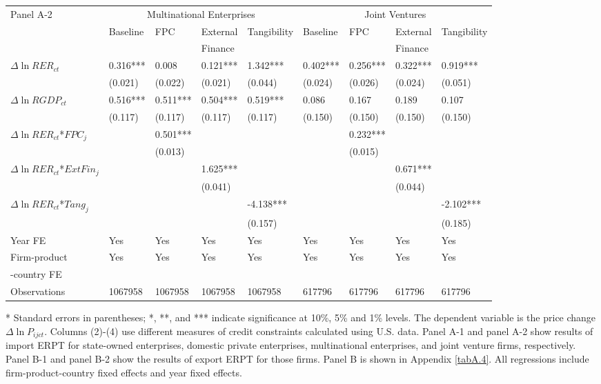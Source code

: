 \documentclass[12pt]{article}
\begin{document}
\begin{table}[htbp]
{\begin{threeparttable}
\begin{tabular}{lllllllll}
				\midrule
				Panel A-2 & \multicolumn{4}{c}{Multinational Enterprises} & \multicolumn{4}{c}{Joint Ventures} \\
				& Baseline & FPC   & External  & Tangibility & Baseline & FPC & External  & Tangibility \\
				&  &   & Finance &  &  &   &  Finance &  \\
				\midrule
				$\Delta \ln RER_{ct}$ & 0.316*** & 0.008 & 0.121*** & 1.342*** & 0.402*** & 0.256*** & 0.322*** & 0.919*** \\
				& (0.021) & (0.022) & (0.021) & (0.044) & (0.024) & (0.026) & (0.024) & (0.051) \\
				$\Delta \ln RGDP_{ct}$ & 0.516*** & 0.511*** & 0.504*** & 0.519*** & 0.086 & 0.167 & 0.189 & 0.107 \\
				& (0.117) & (0.117) & (0.117) & (0.117) & (0.150) & (0.150) & (0.150) & (0.150) \\
				$\Delta \ln RER_{ct}$*$FPC_{j}$ &       & 0.501*** &       &       &       & 0.232*** &       &  \\
				&       & (0.013) &       &       &       & (0.015) &       &  \\
				$\Delta \ln RER_{ct}$*$ExtFin_{j}$ &       &       & 1.625*** &       &       &       & 0.671*** &  \\
				&       &       & (0.041) &       &       &       & (0.044) &  \\
				$\Delta \ln RER_{ct}$*$Tang_{j}$ &       &       &       & -4.138*** &       &       &       & -2.102*** \\
				&       &       &       & (0.157) &       &       &       & (0.185) \\
				Year FE  & Yes   & Yes   & Yes   & Yes   & Yes   & Yes   & Yes   & Yes \\
				Firm-product & Yes   & Yes   & Yes   & Yes   & Yes   & Yes   & Yes   & Yes \\
				-country FE &&&&&&&& \\
				Observations     & 1067958 & 1067958 & 1067958 & 1067958 & 617796 & 617796 & 617796 & 617796 \\
				\bottomrule
			\end{tabular}
			\begin{tablenotes}
				\footnotesize
				\item[*] Standard errors in parentheses; *, **, and *** indicate significance at 10\%, 5\% and 1\% levels. The dependent variable is the price change $\Delta \ln P_{ijct}$. Columns (2)-(4) use different measures of credit constraints calculated using U.S. data. Panel A-1 and panel A-2 show results of import ERPT for state-owned enterprises, domestic private enterprises, multinational enterprises, and joint venture firms, respectively. Panel B-1 and panel B-2 show the results of export ERPT for those firms.  Panel B is shown in Appendix \ref{tabA.4}. All regressions include firm-product-country fixed effects and year fixed effects.
			\end{tablenotes}
		\end{threeparttable}
	}
\end{table}
\end{document}
